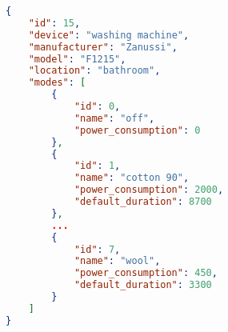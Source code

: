\begin{lstlisting}[language=json,caption={JSON file describing the washing machine.},label=code:appliance_washing_machine,float,floatplacement=H]
{
	"id": 15,
	"device": "washing machine",
	"manufacturer": "Zanussi",
	"model": "F1215",
	"location": "bathroom",
	"modes": [
		{
			"id": 0,
			"name": "off",
			"power_consumption": 0
		},
		{
			"id": 1,
			"name": "cotton 90",
			"power_consumption": 2000,
			"default_duration": 8700
		},
		...	
		{
			"id": 7,
			"name": "wool",
			"power_consumption": 450,
			"default_duration": 3300
		}
	]
}
\end{lstlisting}